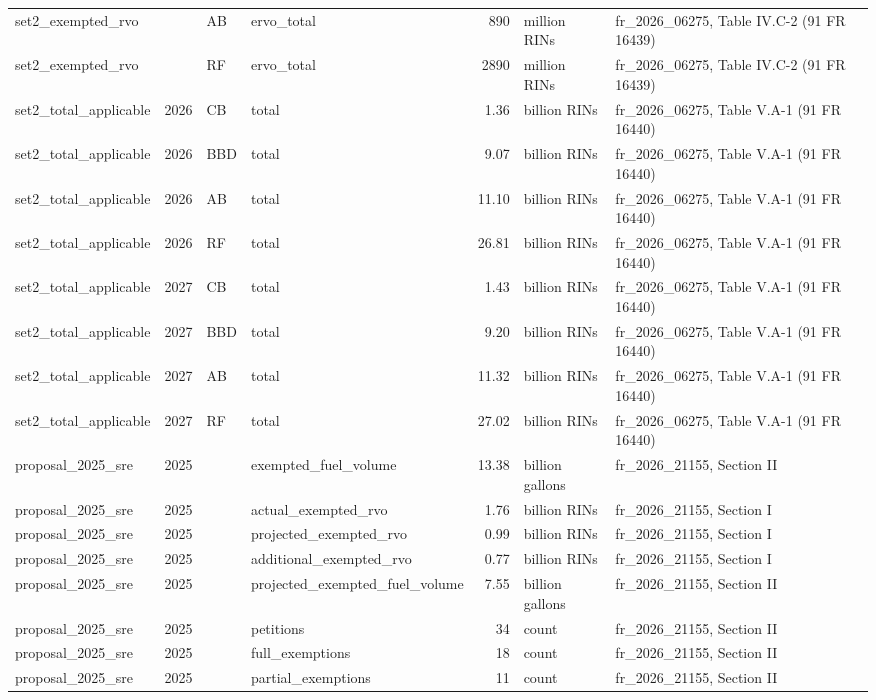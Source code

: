 \begin{longtable}{p{2.3cm}p{0.7cm}p{1.0cm}p{2.6cm}rp{1.7cm}p{4.6cm}}
set2\_exempted\_rvo &  & AB & ervo\_total & 890 & million RINs & fr\_2026\_06275, Table IV.C-2 (91 FR 16439) \\
set2\_exempted\_rvo &  & RF & ervo\_total & 2890 & million RINs & fr\_2026\_06275, Table IV.C-2 (91 FR 16439) \\
set2\_total\_applicable & 2026 & CB & total & 1.36 & billion RINs & fr\_2026\_06275, Table V.A-1 (91 FR 16440) \\
set2\_total\_applicable & 2026 & BBD & total & 9.07 & billion RINs & fr\_2026\_06275, Table V.A-1 (91 FR 16440) \\
set2\_total\_applicable & 2026 & AB & total & 11.10 & billion RINs & fr\_2026\_06275, Table V.A-1 (91 FR 16440) \\
set2\_total\_applicable & 2026 & RF & total & 26.81 & billion RINs & fr\_2026\_06275, Table V.A-1 (91 FR 16440) \\
set2\_total\_applicable & 2027 & CB & total & 1.43 & billion RINs & fr\_2026\_06275, Table V.A-1 (91 FR 16440) \\
set2\_total\_applicable & 2027 & BBD & total & 9.20 & billion RINs & fr\_2026\_06275, Table V.A-1 (91 FR 16440) \\
set2\_total\_applicable & 2027 & AB & total & 11.32 & billion RINs & fr\_2026\_06275, Table V.A-1 (91 FR 16440) \\
set2\_total\_applicable & 2027 & RF & total & 27.02 & billion RINs & fr\_2026\_06275, Table V.A-1 (91 FR 16440) \\
proposal\_2025\_sre & 2025 &  & exempted\_fuel\_volume & 13.38 & billion gallons & fr\_2026\_21155, Section II \\
proposal\_2025\_sre & 2025 &  & actual\_exempted\_rvo & 1.76 & billion RINs & fr\_2026\_21155, Section I \\
proposal\_2025\_sre & 2025 &  & projected\_exempted\_rvo & 0.99 & billion RINs & fr\_2026\_21155, Section I \\
proposal\_2025\_sre & 2025 &  & additional\_exempted\_rvo & 0.77 & billion RINs & fr\_2026\_21155, Section I \\
proposal\_2025\_sre & 2025 &  & projected\_exempted\_fuel\_volume & 7.55 & billion gallons & fr\_2026\_21155, Section II \\
proposal\_2025\_sre & 2025 &  & petitions & 34 & count & fr\_2026\_21155, Section II \\
proposal\_2025\_sre & 2025 &  & full\_exemptions & 18 & count & fr\_2026\_21155, Section II \\
proposal\_2025\_sre & 2025 &  & partial\_exemptions & 11 & count & fr\_2026\_21155, Section II \\

\end{longtable}
